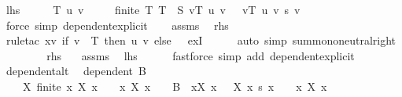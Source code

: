 \begin{isabellebody}
\ {\isacharquery}{\kern0pt}lhs\isanewline
\ \ \isamarkupfalse%
\ \isamarkupfalse%
\ T\ u\ v\isanewline
\ \ \ \ \ {\isachardoublequoteopen}finite\ T{\isachardoublequoteclose}\ {\isachardoublequoteopen}T\ {\isasymsubseteq}\ S{\isachardoublequoteclose}\ {\isachardoublequoteopen}v{\isasymin}T{\isachardoublequoteclose}\ {\isachardoublequoteopen}u\ v\ {\isasymnoteq}\ {}{\isachardoublequoteclose}\ {\isachardoublequoteopen}{\isacharparenleft}{\kern0pt}{\isasymSum}v{\isasymin}T{\isachardot}{\kern0pt}\ u\ v\ {\isacharasterisk}{\kern0pt}s\ v{\isacharparenright}{\kern0pt}\ {\isacharequal}{\kern0pt}\ {}{\isachardoublequoteclose}\isanewline
\ \ \ \ \isamarkupfalse%
\ {\isacharparenleft}{\kern0pt}force\ simp{\isacharcolon}{\kern0pt}\ dependent{\isacharunderscore}{\kern0pt}explicit{\isacharparenright}{\kern0pt}\isanewline
\ \ \isamarkupfalse%
\ assms\ \isamarkupfalse%
\ {\isacharquery}{\kern0pt}rhs\isanewline
\ \ \ \ \isamarkupfalse%
\ {\isacharparenleft}{\kern0pt}rule{\isacharunderscore}{\kern0pt}tac\ x{\isacharequal}{\kern0pt}{\isachardoublequoteopen}{\isasymlambda}v{\isachardot}{\kern0pt}\ if\ v\ {\isasymin}\ T\ then\ u\ v\ else\ {}{\isachardoublequoteclose}\ \ exI{\isacharparenright}{\kern0pt}\isanewline
\ \ \ \ \isamarkupfalse%
\ {\isacharparenleft}{\kern0pt}auto\ simp{\isacharcolon}{\kern0pt}\ sum{\isachardot}{\kern0pt}mono{\isacharunderscore}{\kern0pt}neutral{\isacharunderscore}{\kern0pt}right{\isacharparenright}{\kern0pt}\isanewline
\ \ \ \ \isamarkupfalse%
\isanewline
{}\isamarkupfalse%
\isanewline
\ \ \isamarkupfalse%
\ {\isacharquery}{\kern0pt}rhs\ \ \isamarkupfalse%
\ assms\ \isamarkupfalse%
\ {\isacharquery}{\kern0pt}lhs\isanewline
\ \ \ \ \isamarkupfalse%
\ {\isacharparenleft}{\kern0pt}fastforce\ simp\ add{\isacharcolon}{\kern0pt}\ dependent{\isacharunderscore}{\kern0pt}explicit{\isacharparenright}{\kern0pt}\isanewline
{}\isamarkupfalse%
%
\endisatagproof
{\isafoldproof}%
%
\isadelimproof
\isanewline
%
\endisadelimproof
\isanewline
{}\isamarkupfalse%
\ dependent{\isacharunderscore}{\kern0pt}alt{\isacharcolon}{\kern0pt}\isanewline
\ \ {\isachardoublequoteopen}dependent\ B\ {\isasymlongleftrightarrow}\isanewline
\ \ \ \ {\isacharparenleft}{\kern0pt}{\isasymexists}X{\isachardot}{\kern0pt}\ finite\ {\isacharbraceleft}{\kern0pt}x{\isachardot}{\kern0pt}\ X\ x\ {\isasymnoteq}\ {}{\isacharbraceright}{\kern0pt}\ {\isasymand}\ {\isacharbraceleft}{\kern0pt}x{\isachardot}{\kern0pt}\ X\ x\ {\isasymnoteq}\ {}{\isacharbraceright}{\kern0pt}\ {\isasymsubseteq}\ B\ {\isasymand}\ {\isacharparenleft}{\kern0pt}{\isasymSum}x{\isacharbar}{\kern0pt}X\ x\ {\isasymnoteq}\ {}{\isachardot}{\kern0pt}\ X\ x\ {\isacharasterisk}{\kern0pt}s\ x{\isacharparenright}{\kern0pt}\ {\isacharequal}{\kern0pt}\ {}\ {\isasymand}\ {\isacharparenleft}{\kern0pt}{\isasymexists}x{\isachardot}{\kern0pt}\ X\ x\ {\isasymnoteq}\ {}{\isacharparenright}{\kern0pt}{\isacharparenright}{\kern0pt}{\isachardoublequoteclose}\isanewline

\end{isabellebody}
